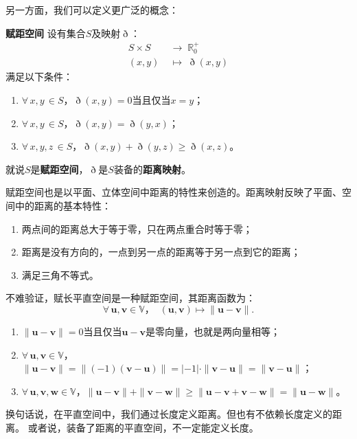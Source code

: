 \documentclass[12pt,UTF8]{ctexbook}
\begin{document}
另一方面，我们可以定义更广泛的概念：
\begin{df}{\textbf{赋距空间}}
    设有集合$S$及映射$\eth$：
    \begin{align*}
        S\times S \;&\rightarrow \; \mathbb{R}_0^+ \\
        (x, y) \;&\mapsto \; \eth(x, y)
    \end{align*}
    满足以下条件：
    \begin{enumerate}
        \item $\forall \, x, y\, \in S$，$\eth(x, y) = 0$当且仅当$x = y$；
        \item $\forall \, x, y\, \in S$，$\eth(x, y) = \eth(y, x)$；
        \item $\forall \, x, y, z\, \in S$，$\eth(x, y) + \eth(y, z) \geqslant \eth (x, z)$。
    \end{enumerate}
    就说$S$是\textbf{赋距空间}，$\eth$是$S$装备的\textbf{距离映射}。
\end{df}

赋距空间也是以平面、立体空间中距离的特性来创造的。距离映射反映了平面、空间中的距离的基本特性：
\begin{enumerate}
    \item 两点间的距离总大于等于零，只在两点重合时等于零；
    \item 距离是没有方向的，一点到另一点的距离等于另一点到它的距离；
    \item 满足三角不等式。
\end{enumerate}

不难验证，赋长平直空间是一种赋距空间，其距离函数为：
$$ \forall \, \mathbf{u}, \mathbf{v} \in \mathbb{V}，\;\; (\mathbf{u}, \mathbf{v}) \mapsto \| \mathbf{u} - \mathbf{v} \|.$$
\begin{enumerate}
    \item $\| \mathbf{u} - \mathbf{v} \| = 0$当且仅当$\mathbf{u} - \mathbf{v}$是零向量，也就是两向量相等；
    \item $\forall \, \mathbf{u}, \mathbf{v} \in \mathbb{V}$，$\| \mathbf{u} - \mathbf{v} \| = \| (-1) (\mathbf{v} - \mathbf{u}) \| = |-1|\cdot \| \mathbf{v} - \mathbf{u} \| = \| \mathbf{v} - \mathbf{u} \|$；
    \item $\forall \, \mathbf{u}, \mathbf{v}, \mathbf{w} \in \mathbb{V}$，$\| \mathbf{u} - \mathbf{v} \| + \| \mathbf{v} - \mathbf{w} \| \geqslant \| \mathbf{u} - \mathbf{v} + \mathbf{v} - \mathbf{w}\| = \| \mathbf{u} - \mathbf{w} \|$。
\end{enumerate}

换句话说，在平直空间中，我们通过长度定义距离。但也有不依赖长度定义的距离。
或者说，装备了距离的平直空间，不一定能定义长度。
\end{document}
